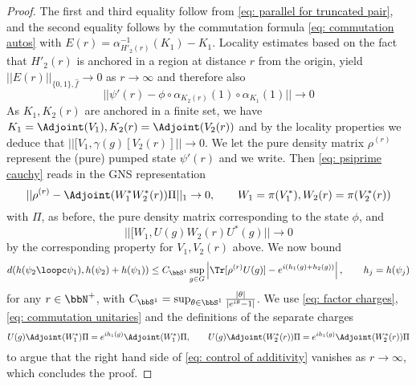 \begin{proof}
	The first and third equality follow from \eqref{eq: parallel for truncated pair}, and the second equality follows by the commutation formula \eqref{eq: commutation autos}
	with $E(r)=\alpha^{-1}_{H'_2(r)}(K_1)-K_1$.  Locality estimates based on the fact that $H'_2(r)$ is anchored in a region at distance $r$ from the origin, yield  $||E(r)||_{\{0,1\},\hat{f}}\to 0$ as $r\to\infty$ and therefore also
	\begin{equation}\label{eq: psiprime cauchy}
		||   \psi'(r) -  \phi \circ \alpha_{K_2(r)}(1) \circ \alpha_{K_1}(1) || \to 0
	\end{equation}
	As $K_1,K_2(r)$ are anchored in a finite set, we have $K_1=\Adjoint(V_1), K_2(r)=\Adjoint(V_2(r)) $ and by the locality properties we deduce that  $ ||[V_1,\gamma(g)[V_2(r)]|| \to 0$.
	We let the pure density matrix $\rho^{(r)}$ represent the (pure) pumped state $\psi'(r)$ and we write.  Then \eqref{eq: psiprime cauchy} reads in the GNS representation
	\begin{equation}\label{eq: factor charges}
		|| \rho^{(r)}-  \Adjoint(W^*_1 W^*_2(r))\Pi  ||_1 \to 0, \qquad W_1=\pi(V^*_1), W_2(r)=\pi(V^*_2(r))
	\end{equation}
	with $\Pi$, as before, the pure density matrix corresponding to the state $\phi$, and 
	\begin{equation}\label{eq: commutation unitaries}
		||[W_1,U(g)W_2(r)U^*(g)|| \to 0
	\end{equation}
	by the corresponding property for $V_1,V_2(r)$ above. We now bound
	\begin{equation} \label{eq: control of additivity}
		d(h(\psi_2\loopc\psi_1),h(\psi_2)+h(\psi_1)) \leq {C_{\bbS^1}}\sup_{g\in G}\left| \Tr [ \rho^{(r)} U(g)] - e^{i(h_1(g)+h_2(g))}   \right|, \qquad h_j=h(\psi_j)
	\end{equation}
	for any  $r\in\bbN^+$, with $C_{\bbS^1}=\sup_{\theta\in\bbS^1}\frac{|\theta|}{|e^{i\theta}-1|}$.    We use \eqref{eq: factor charges}, \eqref{eq: commutation unitaries} and the definitions of the separate charges
	$$
	U(g)\Adjoint(W^*_1)\Pi =   e^{i h_1(g)}  \Adjoint(W^*_1)\Pi,\qquad  U(g)  \Adjoint(W^*_2(r))\Pi =   e^{i h_1(g)}   \Adjoint(W^*_2(r))\Pi
	$$
	to argue that the right hand side of \eqref{eq: control of additivity} vanishes as $r\to\infty$, which concludes the proof. 

\end{proof}
